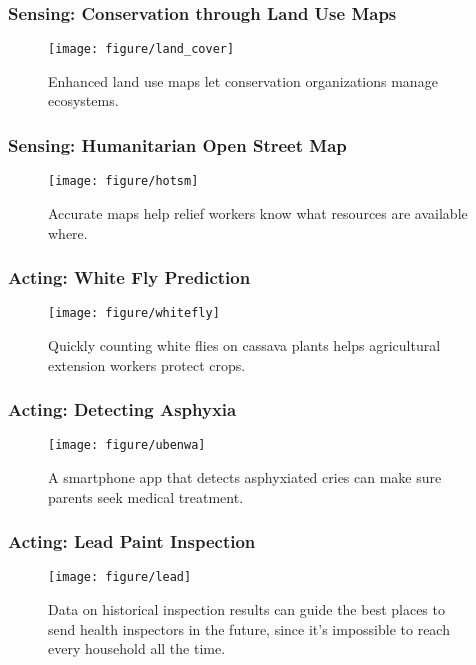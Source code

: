 \documentclass[10pt,mathserif]{beamer}
\begin{document}
\begin{frame}
  \frametitle{Sensing: Conservation through Land Use Maps}
  \begin{figure}[ht]
    \centering
    \texttt{[image: figure/land\_cover]}
    \caption{Enhanced land use maps let conservation organizations manage
      ecosystems. \label{fig:land_use} }
  \end{figure}
\end{frame}

\begin{frame}
  \frametitle{Sensing: Humanitarian Open Street Map}
  \begin{figure}[ht]
    \centering
    \texttt{[image: figure/hotsm]}
    \caption{Accurate maps help relief workers know what resources are available
      where. \label{fig:hotsm} }
  \end{figure}
\end{frame}

\begin{frame}
  \frametitle{Acting: White Fly Prediction}
  \begin{figure}[ht]
    \centering
    \texttt{[image: figure/whitefly]}
    \caption{Quickly counting white flies on cassava plants helps agricultural
      extension workers protect crops. \label{fig:whitefly} }
  \end{figure}
\end{frame}

\begin{frame}
  \frametitle{Acting: Detecting Asphyxia}
  \begin{figure}[ht]
    \centering
    \texttt{[image: figure/ubenwa]}
    \caption{A smartphone app that detects asphyxiated cries can make sure
      parents seek medical treatment.
      \label{fig:asphyx} }
  \end{figure}
\end{frame}

\begin{frame}
  \frametitle{Acting: Lead Paint Inspection}
  \begin{figure}[ht]
    \centering
    \texttt{[image: figure/lead]}
    \caption{Data on historical inspection results can guide the best places to
      send health inspectors in the future, since it's impossible to reach every
      household all the time.
      \label{fig:lead_paint} }
  \end{figure}
\end{frame}
\end{document}
